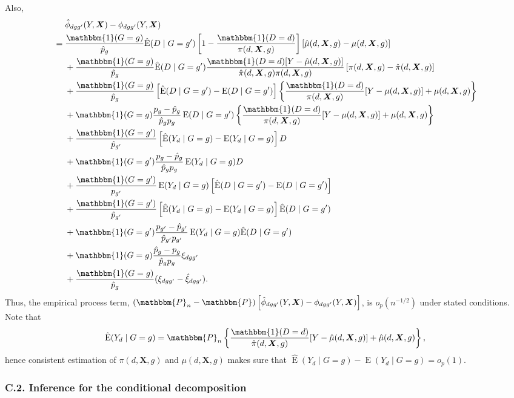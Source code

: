 \documentclass[12pt,a4paper]{article}
\newcommand{\E}{\operatorname{E}}
\def\X{{\boldsymbol X}}
\def\one{\mathbbm{1}}
\def\P{\mathbbm{P}}
\begin{document}
Also,
\begin{align*}
    &\phantom{{}={}} \hat{\phi}_{dgg'}(Y,\X)- \phi_{dgg'}(Y,\X) \\
    &= \frac{\one(G=g)}{\hat{p}_{g}} \hat{\E}(D \mid G=g')  \left[ 1-\frac{\one(D=d)}{\pi(d,\X,g)} \right] \left[\hat{\mu}(d,\X,g)-\mu(d,\X,g)\right]  \\
    &\phantom{{}={}} + \frac{\one(G=g)}{\hat{p}_{g}} \hat{\E}(D \mid G=g')  \frac{\one(D=d)[Y-\hat{\mu}(d,\X,g)]}{\hat{\pi}(d,\X,g)\pi(d,\X,g)}\left[\pi(d,\X,g)-\hat{\pi}(d,\X,g)\right] \\
    &\phantom{{}={}} + \frac{\one(G=g)}{\hat{p}_{g}} \left[\hat{\E}(D \mid G=g')-\E(D \mid G=g')\right] \left\{ \frac{\one(D=d)}{\pi(d,\X,g)} [Y-\mu(d,\X,g)] + \mu(d,\X,g) \right\} \\
    &\phantom{{}={}} + \one(G=g)\frac{p_g-\hat{p}_g}{\hat{p}_g p_g} \E(D \mid G=g') \left\{ \frac{\one(D=d)}{\pi(d,\X,g)} [Y-\mu(d,\X,g)] + \mu(d,\X,g) \right\} \\
    &\phantom{{}={}} + \frac{\one(G=g')}{\hat{p}_{g'}} \left[\hat{\E}(Y_d \mid G=g)-\E(Y_d \mid G=g)\right]D \\
    &\phantom{{}={}} + \one(G=g') \frac{p_g-\hat{p}_g}{\hat{p}_g p_g} \E(Y_d \mid G=g)D \\
    &\phantom{{}={}} + \frac{\one(G=g')}{p_{g'}} \E(Y_d \mid G=g) \left[\hat{\E}(D \mid G=g')-\E(D \mid G=g') \right] \\
    &\phantom{{}={}} + \frac{\one(G=g')}{\hat{p}_{g'}} \left[\hat{\E}(Y_d \mid G=g)-\E(Y_d \mid G=g)\right] \hat{\E}(D \mid G=g') \\
    &\phantom{{}={}} + \one(G=g')\frac{p_{g'}-\hat{p}_{g'}}{\hat{p}_{g'}p_{g'}} \E(Y_d \mid G=g)\hat{\E}(D \mid G=g') \\
    &\phantom{{}={}} + \one(G=g)\frac{\hat{p}_{g}-p_{g}}{\hat{p}_{g}p_{g}}\xi_{dgg'} \\
    &\phantom{{}={}} + \frac{\one(G=g)}{\hat{p}_{g}}(\xi_{dgg'}-\hat{\xi}_{dgg'}).
\end{align*}
Thus, the empirical process term, $(\P_n-\P)\left[\hat{\phi}_{dgg'}(Y,\X)- \phi_{dgg'}(Y,\X) \right]$, is $o_p(n^{-1/2})$ under stated conditions. Note that 
$$\hat{\E}(Y_d \mid G=g)=\P_n\left\{ \frac{\one(D=d)}{\hat{\pi}(d,\X,g)} [Y-\hat{\mu}(d,\X,g)] + \hat{\mu}(d,\X,g) \right\},$$
hence consistent estimation of $\pi(d,\X,g)$ and $\mu(d,\X,g)$ makes sure that $\hat{\E}(Y_d \mid G=g)-\E(Y_d \mid G=g)=o_p(1)$.

\subsubsection*{C.2. Inference for the conditional decomposition}
\end{document}
